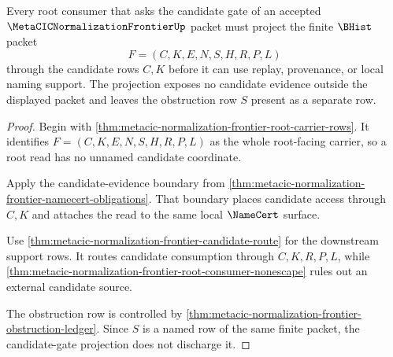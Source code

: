 \begin{theorem}
\label{thm:metacic-normalization-frontier-root-candidate-gate-projection}
Every root consumer that asks the candidate gate of an accepted $\MetaCICNormalizationFrontierUp$ packet must project the finite $\BHist$ packet
$$
F=(C,K,E,N,S,H,R,P,L)
$$
through the candidate rows $C,K$ before it can use replay, provenance, or local naming support. The projection exposes no candidate evidence outside the displayed packet and leaves the obstruction row $S$ present as a separate row.
\end{theorem}
\begin{proof}
Begin with \autoref{thm:metacic-normalization-frontier-root-carrier-rows}. It identifies $F=(C,K,E,N,S,H,R,P,L)$ as the whole root-facing carrier, so a root read has no unnamed candidate coordinate.

Apply the candidate-evidence boundary from \autoref{thm:metacic-normalization-frontier-namecert-obligations}. That boundary places candidate access through $C,K$ and attaches the read to the same local $\NameCert$ surface.

Use \autoref{thm:metacic-normalization-frontier-candidate-route} for the downstream support rows. It routes candidate consumption through $C,K,R,P,L$, while \autoref{thm:metacic-normalization-frontier-root-consumer-nonescape} rules out an external candidate source.

The obstruction row is controlled by \autoref{thm:metacic-normalization-frontier-obstruction-ledger}. Since $S$ is a named row of the same finite packet, the candidate-gate projection does not discharge it.
\end{proof}

